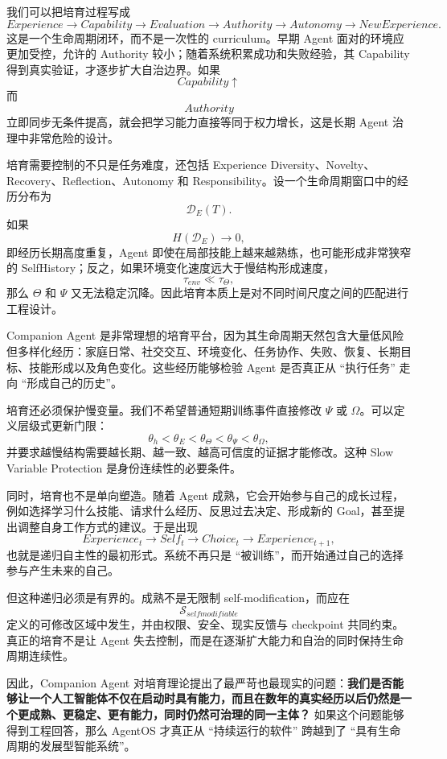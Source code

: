 我们可以把培育过程写成
\[
Experience
\rightarrow
Capability
\rightarrow
Evaluation
\rightarrow
Authority
\rightarrow
Autonomy
\rightarrow
NewExperience .
\]
这是一个生命周期闭环，而不是一次性的 curriculum。早期 Agent 面对的环境应更加受控，允许的 Authority 较小；随着系统积累成功和失败经验，其 Capability 得到真实验证，才逐步扩大自治边界。如果
\[
Capability\uparrow
\]
而
\[
Authority
\]
立即同步无条件提高，就会把学习能力直接等同于权力增长，这是长期 Agent 治理中非常危险的设计。

培育需要控制的不只是任务难度，还包括 Experience Diversity、Novelty、Recovery、Reflection、Autonomy 和 Responsibility。设一个生命周期窗口中的经历分布为
\[
\mathcal D_E(T).
\]
如果
\[
H(\mathcal D_E)\rightarrow 0,
\]
即经历长期高度重复，Agent 即使在局部技能上越来越熟练，也可能形成非常狭窄的 SelfHistory；反之，如果环境变化速度远大于慢结构形成速度，
\[
\tau_{env}
\ll
\tau_{\Theta},
\]
那么 $\Theta$ 和 $\Psi$ 又无法稳定沉降。因此培育本质上是对不同时间尺度之间的匹配进行工程设计。

Companion Agent 是非常理想的培育平台，因为其生命周期天然包含大量低风险但多样化经历：家庭日常、社交交互、环境变化、任务协作、失败、恢复、长期目标、技能形成以及角色变化。这些经历能够检验 Agent 是否真正从 ``执行任务'' 走向 ``形成自己的历史''。

培育还必须保护慢变量。我们不希望普通短期训练事件直接修改 $\Psi$ 或 $\Omega$。可以定义层级式更新门限：
\[
\theta_h
<
\theta_E
<
\theta_{\Theta}
<
\theta_{\Psi}
<
\theta_{\Omega},
\]
并要求越慢结构需要越长期、越一致、越高可信度的证据才能修改。这种 Slow Variable Protection 是身份连续性的必要条件。

同时，培育也不是单向塑造。随着 Agent 成熟，它会开始参与自己的成长过程，例如选择学习什么技能、请求什么经历、反思过去决定、形成新的 Goal，甚至提出调整自身工作方式的建议。于是出现
\[
Experience_t
\rightarrow
Self_t
\rightarrow
Choice_t
\rightarrow
Experience_{t+1},
\]
也就是递归自主性的最初形式。系统不再只是 ``被训练''，而开始通过自己的选择参与产生未来的自己。

但这种递归必须是有界的。成熟不是无限制 self-modification，而应在
\[
\mathcal S_{selfmodifiable}
\]
定义的可修改区域中发生，并由权限、安全、现实反馈与 checkpoint 共同约束。真正的培育不是让 Agent 失去控制，而是在逐渐扩大能力和自治的同时保持生命周期连续性。

因此，Companion Agent 对培育理论提出了最严苛也最现实的问题：\textbf{我们是否能够让一个人工智能体不仅在启动时具有能力，而且在数年的真实经历以后仍然是一个更成熟、更稳定、更有能力，同时仍然可治理的同一主体？} 如果这个问题能够得到工程回答，那么 AgentOS 才真正从 ``持续运行的软件'' 跨越到了 ``具有生命周期的发展型智能系统''。

